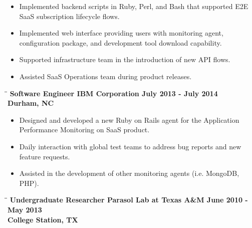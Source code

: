 \documentclass[8pt]{res}
\begin{document}
\begin{resume}
\begin{itemize}
      \item Implemented backend scripts in Ruby, Perl, and Bash that supported E2E SaaS subscription lifecycle flows.
      \item Implemented web interface providing users with monitoring agent, configuration package, and development tool download capability.
      \item Supported infrastructure team in the introduction of new API flows.
      \item Assisted SaaS Operations team during product releases.
    \end{itemize}\vspace{-18pt}      %
    \begin{tabbing}
      \hspace{2.3in}\= \hspace{2.6in}\= \kill %
      \bf Software Engineer \>\bf IBM Corporation \>\bf July 2013 - July 2014\\ \>\bf Durham, NC
    \end{tabbing}\vspace{-10pt}      %
    \begin{itemize}
      \item Designed and developed a new Ruby on Rails agent for the Application Performance Monitoring on SaaS product.
      \item Daily interaction with global test teams to address bug reports and new feature requests.
      \item Assisted in the development of other monitoring agents (i.e. MongoDB, PHP).
    \end{itemize}\vspace{-18pt}      %
    \begin{tabbing}
      \hspace{2.3in}\= \hspace{2.6in}\= \kill %
      \bf Undergraduate Researcher \>\bf Parasol Lab at Texas A\&M \>\bf June 2010 - May 2013\\ \>\bf College Station, TX
    \end{tabbing}\vspace{-10pt}      %
    \begin{itemize}

\end{itemize}
\end{resume}
\end{document}
